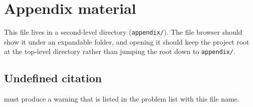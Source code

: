 \chapter{Appendix material}\label{ch:appendix}

This file lives in a second-level directory (\texttt{appendix/}). The file
browser should show it under an expandable folder, and opening it should keep
the project root at the top-level directory rather than jumping the root down
to \texttt{appendix/}.

\section{Undefined citation}
\cite{this-key-is-not-in-refs} must produce a warning that is listed in the
problem list with this file name.
